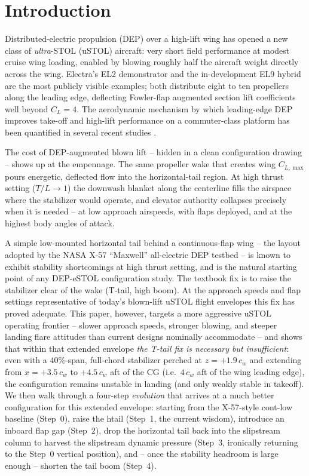 \documentclass[conf]{new-aiaa}
\begin{document}
\section{Introduction}

Distributed-electric propulsion (DEP) over a high-lift wing
has opened a new class of \emph{ultra}-STOL (uSTOL) aircraft:
very short field performance at modest cruise wing loading,
enabled by blowing roughly half the aircraft weight directly
across the wing.  Electra's EL2 demonstrator and the
in-development EL9 hybrid are the most publicly visible
examples; both distribute eight to ten propellers along the
leading edge, deflecting Fowler-flap augmented section lift
coefficients well beyond $C_L = 4$.  The aerodynamic mechanism
by which leading-edge DEP improves take-off and high-lift
performance on a commuter-class platform has been quantified
in several recent studies \cite{Cusati2023DEPCommuter}.

The cost of DEP-augmented blown lift -- hidden in a clean
configuration drawing -- shows up at the empennage.  The same
propeller wake that creates wing $C_{L,\max}$ pours energetic,
deflected flow into the horizontal-tail region.  At high
thrust setting ($T/L \to 1$) the downwash blanket along the
centerline fills the airspace where the stabilizer would
operate, and elevator authority collapses precisely when it is
needed -- at low approach airspeeds, with flaps deployed, and
at the highest body angles of attack.

A simple low-mounted horizontal tail behind a continuous-flap
wing -- the layout adopted by the NASA X-57 ``Maxwell''
all-electric DEP testbed
\cite{Deere2017X57HighFidelity,Viken2017X57Airfoils,HwangNing2018X57MDO}
-- is known
to exhibit stability shortcomings at high thrust setting, and
is the natural starting point of any DEP-eSTOL configuration
study.  The textbook fix is to raise the stabilizer clear of
the wake (T-tail, high boom).  At the approach speeds and
flap settings representative of today's blown-lift uSTOL flight
envelopes this fix has proved adequate.  This paper, however,
targets a more aggressive uSTOL operating frontier -- slower
approach speeds, stronger blowing, and steeper landing flare
attitudes than current designs nominally accommodate -- and
shows that within that extended envelope \emph{the T-tail fix
is necessary but insufficient}: even with a $40\%$-span,
full-chord stabilizer perched at $z=+1.9\,c_w$ and extending
from $x=+3.5\,c_w$ to $+4.5\,c_w$ aft of the CG
(i.e.\ $4\,c_w$ aft of the wing leading edge), the
configuration remains unstable in landing (and only weakly
stable in takeoff).  We then walk through
a four-step \emph{evolution} that arrives at a much better
configuration for this extended envelope: starting from the
X-57-style cont-low baseline (Step~0), raise the htail (Step~1,
the current wisdom), introduce an inboard flap gap
(Step~2), drop the horizontal tail back into the slipstream
column to harvest the slipstream dynamic pressure
(Step~3, ironically returning to the Step~0 vertical position),
and -- once the stability headroom is large enough -- shorten
the tail boom (Step~4).
\end{document}
